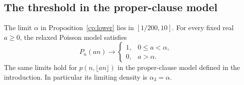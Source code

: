 \subsection{The threshold in the proper-clause model}

\begin{theorem}
\label{cp:threshold}
The limit $\alpha$ in Proposition~\ref{cp:lower} lies in $[1/200,10]$.
For every fixed real $a\ge0$, the relaxed Poisson model satisfies
\[
 P_n(an)\longrightarrow
 \begin{cases}
 1,&0\le a<\alpha,\\
 0,&a>\alpha.
 \end{cases}
\]
The same limits hold for $p(n,\lfloor an\rfloor)$ in the proper-clause
model defined in the introduction. In particular its limiting density is
$\alpha_3=\alpha$.
\end{theorem}

